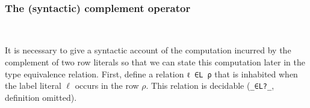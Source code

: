 \documentclass[authoryear, acmsmall, screen, review, nonacm]{acmart} %
\begin{document}
\begin{code}
\AgdaSpace{}%
\AgdaSpace{}%
\AgdaSpace{}%
\AgdaSpace{}%
\AgdaSpace{}%
\AgdaSpace{}%
\AgdaSpace{}%
\AgdaOperator{\AgdaInductiveConstructor{R[}}\AgdaSpace{}%
\AgdaSpace{}%
\AgdaOperator{\AgdaInductiveConstructor{]}}\<%
\\
\>[0]\AgdaSpace{}%
\AgdaSpace{}%
\AgdaSpace{}%
\AgdaSymbol{=}\AgdaSpace{}%
\AgdaSpace{}%
\AgdaSpace{}%
\AgdaSpace{}%
\AgdaSpace{}%
\<%
\end{code}

\subsubsection{The (syntactic) complement operator}~

It is necessary to give a syntactic account of the computation incurred by the complement of two row literals so that we can state this computation later in the type equivalence relation. First, define a relation \verb!ℓ ∈L ρ! that is inhabited when the label literal $\ell$ occurs in the row $\rho$. This relation is decidable (\verb!_∈L?_!, definition omitted).
\end{document}

